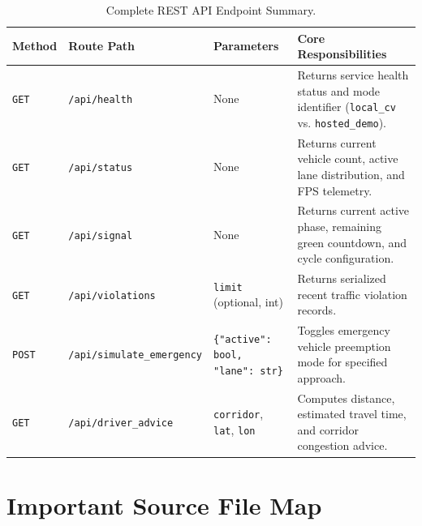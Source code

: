 \begin{table}[H]
\centering
\small
\begin{tabularx}{\textwidth}{l l p{3.8cm} X}
\toprule
\textbf{Method} & \textbf{Route Path} & \textbf{Parameters} & \textbf{Core Responsibilities} \\
\midrule
\texttt{GET} & \texttt{/api/health} & None & Returns service health status and mode identifier (\texttt{local\_cv} vs. \texttt{hosted\_demo}). \\
\texttt{GET} & \texttt{/api/status} & None & Returns current vehicle count, active lane distribution, and FPS telemetry. \\
\texttt{GET} & \texttt{/api/signal} & None & Returns current active phase, remaining green countdown, and cycle configuration. \\
\texttt{GET} & \texttt{/api/violations} & \texttt{limit} (optional, int) & Returns serialized recent traffic violation records. \\
\texttt{POST} & \texttt{/api/simulate\_emergency} & \texttt{\{"active": bool, "lane": str\}} & Toggles emergency vehicle preemption mode for specified approach. \\
\texttt{GET} & \texttt{/api/driver\_advice} & \texttt{corridor}, \texttt{lat}, \texttt{lon} & Computes distance, estimated travel time, and corridor congestion advice. \\
\bottomrule
\end{tabularx}
\caption{Complete REST API Endpoint Summary.}
\label{tab:glossary_endpoints}
\end{table}

\section{Important Source File Map}
\label{sec:glossary_source_map}

